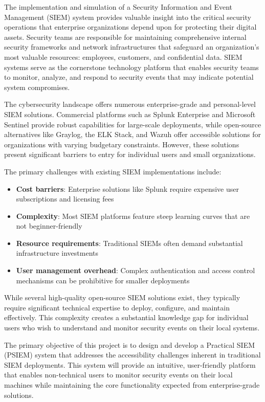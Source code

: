The implementation and simulation of a Security Information and Event Management (SIEM) system provides valuable insight into the critical security operations that enterprise organizations depend upon for protecting their digital assets. Security teams are responsible for maintaining comprehensive internal security frameworks and network infrastructures that safeguard an organization's most valuable resources: employees, customers, and confidential data. SIEM systems serve as the cornerstone technology platform that enables security teams to monitor, analyze, and respond to security events that may indicate potential system compromises.

The cybersecurity landscape offers numerous enterprise-grade and personal-level SIEM solutions. Commercial platforms such as Splunk Enterprise and Microsoft Sentinel provide robust capabilities for large-scale deployments, while open-source alternatives like Graylog, the ELK Stack, and Wazuh offer accessible solutions for organizations with varying budgetary constraints. However, these solutions present significant barriers to entry for individual users and small organizations.

The primary challenges with existing SIEM implementations include:

\begin{itemize}
    \item \textbf{Cost barriers}: Enterprise solutions like Splunk require expensive user subscriptions and licensing fees
    \item \textbf{Complexity}: Most SIEM platforms feature steep learning curves that are not beginner-friendly
    \item \textbf{Resource requirements}: Traditional SIEMs often demand substantial infrastructure investments
    \item \textbf{User management overhead}: Complex authentication and access control mechanisms can be prohibitive for smaller deployments
\end{itemize}

While several high-quality open-source SIEM solutions exist, they typically require significant technical expertise to deploy, configure, and maintain effectively. This complexity creates a substantial knowledge gap for individual users who wish to understand and monitor security events on their local systems.

The primary objective of this project is to design and develop a Practical SIEM (PSIEM) system that addresses the accessibility challenges inherent in traditional SIEM deployments. This system will provide an intuitive, user-friendly platform that enables non-technical users to monitor security events on their local machines while maintaining the core functionality expected from enterprise-grade solutions.

